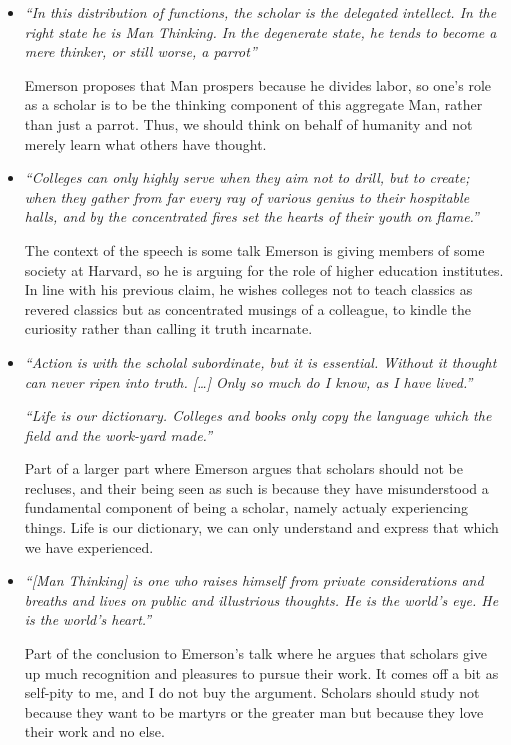 \documentclass[12pt]{article}
\begin{document}
\begin{itemize}
    \item \emph{``In this distribution of functions, the scholar is the delegated
        intellect. In the right state he is Man Thinking. In the degenerate
        state, he tends to become a mere thinker, or still worse, a parrot''}

        Emerson proposes that Man prospers because he divides labor, so one's
        role as a scholar is to be the thinking component of this aggregate Man,
        rather than just a parrot. Thus, we should think on behalf of humanity
        and not merely learn what others have thought.

    \item \emph{``Colleges can only highly serve when they aim not to drill, but to
        create; when they gather from far every ray of various genius to their
        hospitable halls, and by the concentrated fires set the hearts of their
        youth on flame.''}

        The context of the speech is some talk Emerson is giving members of some
        society at Harvard, so he is arguing for the role of higher education
        institutes. In line with his previous claim, he wishes colleges not to
        teach classics as revered classics but as concentrated musings of a
        colleague, to kindle the curiosity rather than calling it truth
        incarnate.

    \item \emph{``Action is with the scholal subordinate, but it is essential. Without
        it thought can never ripen into truth. [\dots] Only so much do I know,
        as I have lived.''}

        \emph{``Life is our dictionary. Colleges and books only copy the
        language which the field and the work-yard made.''}

        Part of a larger part where Emerson argues that scholars should not be
        recluses, and their being seen as such is because they have
        misunderstood a fundamental component of being a scholar, namely actualy
        experiencing things. Life is our dictionary, we can only understand and
        express that which we have experienced.

    \item \emph{``[Man Thinking] is one who raises himself from private
        considerations and breaths and lives on public and illustrious thoughts.
        He is the world's eye. He is the world's heart.''}

        Part of the conclusion to Emerson's talk where he argues that scholars
        give up much recognition and pleasures to pursue their work. It comes
        off a bit as self-pity to me, and I do not buy the argument. Scholars
        should study not because they want to be martyrs or the greater man but
        because they love their work and no else.
\end{itemize}
\end{document}
